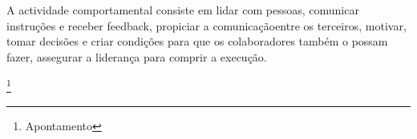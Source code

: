 A actividade comportamental consiste em lidar com pessoas, comunicar instruções e receber feedback, propiciar a comunicaçãoentre os terceiros, motivar, tomar decisões e criar condições para que os colaboradores também o possam fazer, assegurar a liderança para comprir a execução.\\

\newpage
%
%
%
\listoffigures
\cite{*}

\newpage
\footnote{Apontamento}

